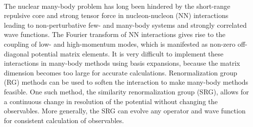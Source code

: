 \documentclass[preprintnumbers,floatfix,aps,prc,preprint,nofootinbib]{revtex4-1}
\begin{document}
\\
The nuclear many-body problem has long been hindered by the short-range repulsive core and strong tensor force in nucleon-nucleon (NN) interactions leading to non-perturbative few- and many-body systems and strongly correlated wave functions. The Fourier transform of NN interactions gives rise to the coupling of low- and high-momentum modes, which is manifested as non-zero off-diagonal potential matrix elements. It is very difficult to implement these interactions in many-body methods using basis expansions, because the matrix dimension becomes too large for accurate calculations. Renormalization group (RG) methods can be used to soften the interaction to make many-body methods feasible. One such method, the similarity renormalization group (SRG), allows for a continuous change in resolution of the potential without changing the observables. More generally, the SRG can evolve any operator and wave function for consistent calculation of observables.
\\
\end{document}
